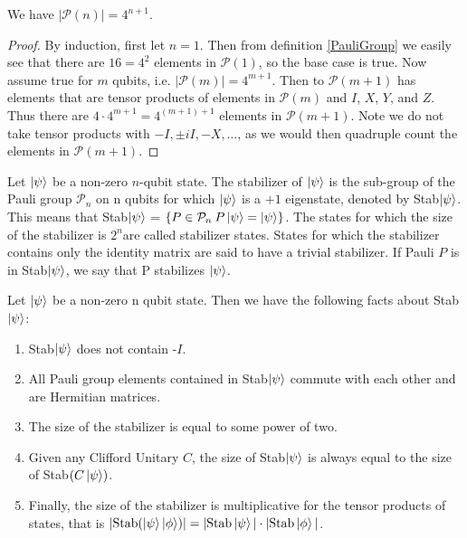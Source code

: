 \documentclass[12pt]{dalthesis}
\begin{document}
\begin{proposition}
  We have $|\mathcal{P}(n)|=4^{n+1}$.
\end{proposition}

\begin{proof}
By induction, first let $n=1$. Then from definition \ref{PauliGroup} we easily see that there are $16 = 4^2$ elements in $\mathcal{P}(1)$, so the base case is true. Now assume true for $m$ qubits, i.e. $|\mathcal{P}(m)| = 4^{m+1}$. Then to $\mathcal{P}(m+1)$ has elements that are tensor products of elements in $\mathcal{P}(m)$ and $I$, $X$, $Y$, and $Z$. Thus there are $4 \cdot 4^{m+1} = 4^{(m+1)+1}$ elements in $\mathcal{P}(m+1)$. Note we do not take tensor products with $-I, \pm iI, -X, \ldots$, as we would then quadruple count the elements in $\mathcal{P}(m+1)$.
\end{proof}

\begin{definition}[Stabilizer]
Let $\ket{\psi}$ be a non-zero $n$-qubit state. The stabilizer of $\ket{\psi}$ is the sub-group of the Pauli group $\mathcal{P}_n$ on n qubits for which $\ket{\psi}$ is a $+1$ eigenstate, denoted by Stab$\ket{\psi}$. This means that Stab$\ket{\psi}$ = $\{P \in \mathcal{P}_n \: P \ket{\psi} = \ket{\psi} \}$. The states for which the size of the stabilizer is $2^n$are called stabilizer states. States for which the stabilizer contains only the identity matrix are said to have a trivial stabilizer. If Pauli $P$ is in Stab$\ket{\psi}$, we say that P stabilizes $\ket{\psi}$.
\end{definition}



\begin{proposition}
\label{stabilizerfacts}
Let $\ket{\psi}$ be a non-zero n qubit state. Then we have the following facts about Stab$\ket{\psi}$:
\begin{enumerate}
\item Stab$\ket{\psi}$ does not contain -$I$.
\item All Pauli group elements contained in Stab$\ket{\psi}$ commute with each other and are Hermitian matrices.
\item The size of the stabilizer is equal to some power of two.
\item Given any Clifford Unitary $C$, the size of Stab$\ket{\psi}$ is always equal to the size of Stab$(C \ket{\psi})$.
\item Finally, the size of the stabilizer is multiplicative for the tensor products of states, that is $| \text{Stab} (\ket{\psi} \ket{\phi})| = |\text{Stab}\ket{\psi}| \cdot |\text{Stab}\ket{\phi}|$. 
\end{enumerate}
\end{proposition}
\end{document}
